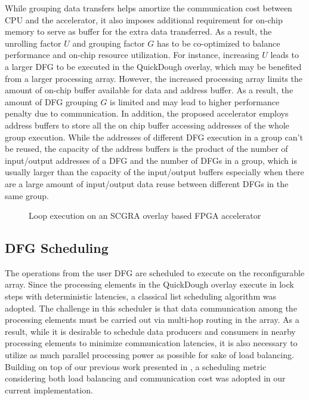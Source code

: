 While grouping data transfers helps amortize the communication cost between CPU and the accelerator, it also imposes additional requirement for on-chip memory to serve as buffer for the extra data transferred. As a result, the unrolling factor $U$ and grouping factor $G$ has to be co-optimized to balance performance and on-chip resource utilization. For instance, increasing $U$ leads to a larger DFG to be executed in the QuickDough overlay, which may be benefited from a larger processing array. However, the increased processing array limits the amount of on-chip buffer available for data and address buffer. As a result, the amount of DFG grouping $G$ is limited and may lead to higher performance penalty due to communication. In addition, the proposed accelerator employs address buffers to store all the on chip buffer accessing addresses of the whole group execution. While the addresses of different DFG execution in a group can't be reused, the capacity of the address buffers is the product of the number of input/output addresses of a DFG and the number of DFGs in a group, which is usually larger than the capacity of the input/output buffers especially when there are a large amount of input/output data reuse between different DFGs in the same group. 

\begin{figure}
\caption{Loop execution on an SCGRA overlay based FPGA accelerator}
\label{fig:blocking-and-dfg-gen}
\end{figure}

\subsection{DFG Scheduling}
The operations from the user DFG are scheduled to execute on the reconfigurable array. Since the processing elements in the QuickDough overlay execute in lock steps with deterministic latencies, a classical list scheduling algorithm \cite{schutten1996list} was adopted. The challenge in this scheduler is that data communication among the processing elements must be carried out via multi-hop routing in the array. As a result, while it is desirable to schedule data producers and consumers in nearby processing elements to minimize communication latencies, it is also necessary to utilize as much parallel processing power as possible for sake of load balancing. Building on top of our previous work presented in \cite{lin2012energy}, a scheduling metric considering both load balancing and communication cost was adopted in our current implementation.

